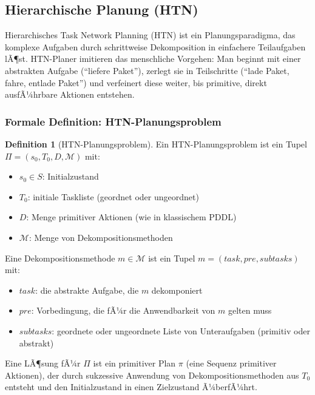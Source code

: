 ﻿\documentclass[a4paper,12pt]{article}
\theoremstyle{definition}
\newtheorem{definition}{Definition}[section]
\begin{document}
\subsection{Hierarchische Planung (HTN)}

Hierarchisches Task Network Planning (HTN) \cite{erol1994} ist ein Planungsparadigma, das komplexe Aufgaben durch schrittweise Dekomposition in einfachere Teilaufgaben lÃ¶st. HTN-Planer imitieren das menschliche Vorgehen: Man beginnt mit einer abstrakten Aufgabe (``liefere Paket''), zerlegt sie in Teilschritte (``lade Paket, fahre, entlade Paket'') und verfeinert diese weiter, bis primitive, direkt ausfÃ¼hrbare Aktionen entstehen.

\subsubsection{Formale Definition: HTN-Planungsproblem}

\begin{definition}[HTN-Planungsproblem]
Ein HTN-Planungsproblem ist ein Tupel $\Pi = (s_0, T_0, D, \mathcal{M})$ mit:
\begin{itemize}
  \item[-] $s_0 \in S$: Initialzustand
  \item[-] $T_0$: initiale Taskliste (geordnet oder ungeordnet)
  \item[-] $D$: Menge primitiver Aktionen (wie in klassischem PDDL)
  \item[-] $\mathcal{M}$: Menge von Dekompositionsmethoden
\end{itemize}
Eine Dekompositionsmethode $m \in \mathcal{M}$ ist ein Tupel $m = (\mathit{task}, \mathit{pre}, \mathit{subtasks})$ mit:
\begin{itemize}
  \item[-] $\mathit{task}$: die abstrakte Aufgabe, die $m$ dekomponiert
  \item[-] $\mathit{pre}$: Vorbedingung, die fÃ¼r die Anwendbarkeit von $m$ gelten muss
  \item[-] $\mathit{subtasks}$: geordnete oder ungeordnete Liste von Unteraufgaben (primitiv oder abstrakt)
\end{itemize}
\end{definition}

Eine LÃ¶sung fÃ¼r $\Pi$ ist ein primitiver Plan $\pi$ (eine Sequenz primitiver Aktionen), der durch sukzessive Anwendung von Dekompositionsmethoden aus $T_0$ entsteht und den Initialzustand in einen Zielzustand Ã¼berfÃ¼hrt.
\end{document}
